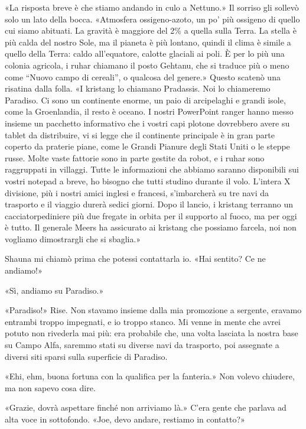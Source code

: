 «La risposta breve è che stiamo andando in culo a Nettuno.» Il sorriso
gli sollevò solo un lato della bocca. «Atmosfera ossigeno-azoto, un po'
più ossigeno di quello cui siamo abituati. La gravità è maggiore del 2\%
a quella sulla Terra. La stella è più calda del nostro Sole, ma il
pianeta è più lontano, quindi il clima è simile a quello della Terra:
caldo all'equatore, calotte glaciali ai poli. È per lo più una colonia
agricola, i ruhar chiamano il posto Gehtanu, che si traduce più o meno
come ``Nuovo campo di cereali'', o qualcosa del genere.» Questo scatenò
una risatina dalla folla. «I kristang lo chiamano Pradassis. Noi lo
chiameremo Paradiso. Ci sono un continente enorme, un paio di
arcipelaghi e grandi isole, come la Groenlandia, il resto è oceano. I
nostri PowerPoint ranger hanno messo insieme un pacchetto informativo
che i vostri capi plotone dovrebbero avere su tablet da distribuire, vi
si legge che il continente principale è in gran parte coperto da
praterie piane, come le Grandi Pianure degli Stati Uniti o le steppe
russe. Molte vaste fattorie sono in parte gestite da robot, e i ruhar
sono raggruppati in villaggi. Tutte le informazioni che abbiamo saranno
disponibili sui vostri notepad a breve, ho bisogno che tutti studino
durante il volo. L'intera X divisione, più i nostri amici inglesi e
francesi, s'imbarcherà su tre navi da trasporto e il viaggio durerà
sedici giorni. Dopo il lancio, i kristang terranno un cacciatorpediniere
più due fregate in orbita per il supporto al fuoco, ma per oggi è tutto.
Il generale Meers ha assicurato ai kristang che possiamo farcela, noi
non vogliamo dimostrargli che si sbaglia.»

\hfill\break

Shauna mi chiamò prima che potessi contattarla io. «Hai sentito? Ce ne
andiamo!»

«Sì, andiamo su Paradiso.»

«Paradiso!» Rise. Non stavamo insieme dalla mia promozione a sergente,
eravamo entrambi troppo impegnati, e io troppo stanco. Mi venne in mente
che avrei potuto non rivederla mai più: era probabile che, una volta
lasciata la nostra base su Campo Alfa, saremmo stati su diverse navi da
trasporto, poi assegnate a diversi siti sparsi sulla superficie di
Paradiso.

«Ehi, ehm, buona fortuna con la qualifica per la fanteria.» Non volevo
chiudere, ma non sapevo cosa dire.

«Grazie, dovrà aspettare finché non arriviamo là.» C'era gente che
parlava ad alta voce in sottofondo. «Joe, devo andare, restiamo in
contatto?»

